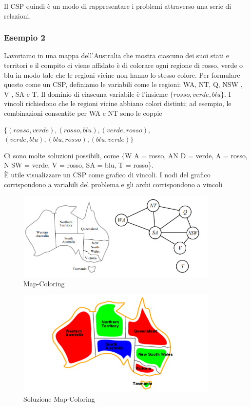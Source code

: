 \noindent Il CSP quindi è un modo di rappresentare i problemi attraverso una
serie di relazioni.
\vspace{0.2cm}

\subsubsection{Esempio 2}
Lavoriamo in una mappa dell'Australia che mostra ciascuno dei suoi stati e
territori e il compito ci viene affidato è di colorare ogni regione di rosso,
verde o blu in modo tale che le regioni vicine non hanno lo stesso colore. Per
formulare questo come un CSP, definiamo le variabili come le regioni: WA, NT, Q,
NSW , V , SA e T. Il dominio di ciascuna variabile è l'insieme $\{rosso, verde,
    blu\}$. I vincoli richiedono che le regioni vicine abbiano colori distinti; ad
esempio, le combinazioni consentite per WA e NT sono le coppie
\begin{center}
    $\{(rosso, verde), (rosso, blu), (verde, rosso),$\\
    $(verde, blu), (blu, rosso),(blu, verde)\}$
\end{center}
Ci sono molte soluzioni possibili, come \{W A = rosso, AN D = verde, A = rosso,
N SW = verde, V = rosso, SA = blu, T = rosso\}. \\È utile visualizzare un CSP
come grafico di vincoli. I nodi del grafico corrispondono a variabili del
problema e gli archi corrispondono a vincoli
\begin{figure}[htp]
    \centering
    \includegraphics[width=10cm, keepaspectratio]{img/Cap1/map-coloring1.png}
    \caption{Map-Coloring}
\end{figure}
\begin{figure}[htp]
    \centering
    \includegraphics[width=10cm, keepaspectratio]{img/Cap1/map-coloring2.png}
    \caption{Soluzione Map-Coloring}
\end{figure}

